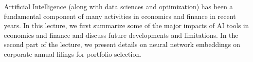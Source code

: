 


\begin{Abstrakt}
Artificial Intelligence (along with data sciences and optimization) has been a fundamental component of many activities in economics and finance in recent years. In this lecture, we first summarize some of the major impacts of AI tools in economics and finance and discuss future developments and limitations. In the second part of the lecture, we present details on neural network embeddings on corporate annual filings for portfolio selection.
\end{Abstrakt}


\clearpage
